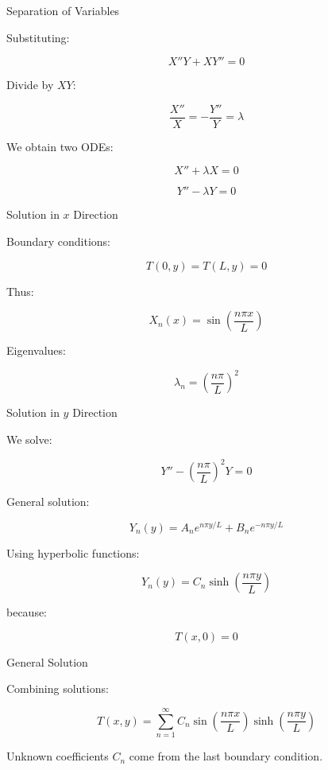 \documentclass{beamer}
\begin{document}
\begin{frame}{Separation of Variables}

Substituting:

\[
X''Y + XY'' = 0
\]

Divide by $XY$:

\[
\frac{X''}{X} = -\frac{Y''}{Y}=\lambda
\]

We obtain two ODEs:

\[
X''+\lambda X=0
\]

\[
Y''-\lambda Y=0
\]

\end{frame}

\begin{frame}{Solution in $x$ Direction}

Boundary conditions:

\[
T(0,y)=T(L,y)=0
\]

Thus:

\[
X_n(x)=\sin\left(\frac{n\pi x}{L}\right)
\]

Eigenvalues:

\[
\lambda_n=\left(\frac{n\pi}{L}\right)^2
\]

\end{frame}

\begin{frame}{Solution in $y$ Direction}

We solve:

\[
Y''-\left(\frac{n\pi}{L}\right)^2Y=0
\]

General solution:

\[
Y_n(y)=A_n e^{n\pi y/L}+B_n e^{-n\pi y/L}
\]

Using hyperbolic functions:

\[
Y_n(y)=C_n\sinh\left(\frac{n\pi y}{L}\right)
\]

because:

\[
T(x,0)=0
\]

\end{frame}

\begin{frame}{General Solution}

Combining solutions:

\[
T(x,y)=
\sum_{n=1}^{\infty}
C_n
\sin\left(\frac{n\pi x}{L}\right)
\sinh\left(\frac{n\pi y}{L}\right)
\]

Unknown coefficients $C_n$ come from the last boundary condition.

\end{frame}
\end{document}

